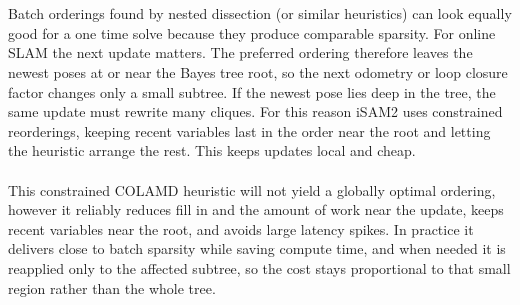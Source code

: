 \\ \\
Batch orderings found by nested dissection (or similar heuristics) can look equally good for a one time solve because they produce comparable sparsity. For online SLAM the next update matters. The preferred ordering therefore leaves the newest poses at or near the Bayes tree root, so the next odometry or loop closure factor changes only a small subtree. If the newest pose lies deep in the tree, the same update must rewrite many cliques. For this reason iSAM2 uses constrained reorderings, keeping recent variables last in the order near the root and letting the heuristic arrange the rest. This keeps updates local and cheap. \cite{Bayes_tree_for_SLAM_paper}
\\ \\
This constrained COLAMD heuristic will not yield a globally optimal ordering, however it reliably reduces fill in and the amount of work near the update, keeps recent variables near the root, and avoids large latency spikes. In practice it delivers close to batch sparsity while saving compute time, and when needed it is reapplied only to the affected subtree, so the cost stays proportional to that small region rather than the whole tree.



